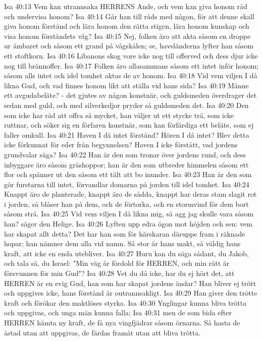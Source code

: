 Isa 40:13  Vem kan utrannsaka HERRENS Ande, och vem kan giva honom råd och undervisa honom?
Isa 40:14  Går han till råds med någon, för att denne skall giva honom förstånd och lära honom den rätta stigen, lära honom kunskap och visa honom förståndets väg?
Isa 40:15  Nej, folken äro att akta såsom en droppe ur ämbaret och såsom ett grand på vågskålen; se, havsländerna lyfter han såsom ett stoftkorn.
Isa 40:16  Libanons skog vore icke nog till offerved och dess djur icke nog till brännoffer.
Isa 40:17  Folken äro allasammans såsom ett intet inför honom; såsom alls intet och idel tomhet aktas de av honom.
Isa 40:18  Vid vem viljen I då likna Gud, och vad finnes honom likt att ställa vid hans sida?
Isa 40:19  Månne ett avgudabeläte? - det gjutes av någon konstnär, och guldsmeden överdrager det sedan med guld, och med silverkedjor pryder så guldsmeden det.
Isa 40:20  Den som icke har råd att offra så mycket, han väljer ut ett stycke trä, som icke ruttnar, och söker sig en förfaren konstnär, som kan förfärdiga ett beläte, som ej faller omkull.
Isa 40:21  Haven I då intet förstånd? Hören I då intet? Blev detta icke förkunnat för eder från begynnelsen? Haven I icke förstått, vad jordens grundvalar säga?
Isa 40:22  Han är den som tronar över jordens rund, och dess inbyggare äro såsom gräshoppor; han är den som utbreder himmelen såsom ett flor och spänner ut den såsom ett tält att bo inunder.
Isa 40:23  Han är den som gör furstarna till intet, förvandlar domarna på jorden till idel tomhet.
Isa 40:24  Knappt äro de planterade, knappt äro de sådda, knappt har deras stam slagit rot i jorden, så blåser han på dem, och de förtorka, och en stormvind för dem bort såsom strå.
Isa 40:25  Vid vem viljen I då likna mig, så agg jag skulle vara såsom han? säger den Helige.
Isa 40:26  Lyften upp edra ögon mot höjden och sen: vem har skapat allt detta? Det har han som för härskaran däruppe fram i räknade hopar; han nämner dem alla vid namn. Så stor är hans makt, så väldig hans kraft, att icke en enda utebliver.
Isa 40:27  Huru kan du säga sådant, du Jakob, och tala så, du Israel: "Min väg är fördold för HERREN, och min rätt är försvunnen för min Gud"?
Isa 40:28  Vet du då icke, har du ej hört det, att HERREN är en evig Gud, han som har skapat jordens ändar? Han bliver ej trött och uppgives icke, hans förstånd är outrannsakligt.
Isa 40:29  Han giver den trötte kraft och förökar den maktlöses styrka.
Isa 40:30  Ynglingar kunna bliva trötta och uppgivas, och unga män kunna falla;
Isa 40:31  men de som bida efter HERREN hämta ny kraft, de få nya vingfjädrar såsom örnarna. Så hasta de åstad utan att uppgivas, de färdas framåt utan att bliva trötta.
